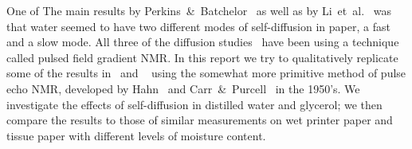 \documentclass[11pt,a4paper, twocolumn,
swedish, english %
]{article}
\begin{document}
One of The main results by
Perkins~\&~Batchelor~\cite{Perkins-Batchelor2012} as well as by
Li~et~al.~\cite{Li-etal1992} was that water 
seemed to have two different modes of self-diffusion in paper, a fast
and a slow mode. All three of the diffusion
studies~\cite{Perkins-Batchelor2012, Li-etal1992,
  Topgaard-Soderman2001} have been using a technique called pulsed 
field gradient NMR. In this report we try to qualitatively replicate
some of the results in~\cite{Perkins-Batchelor2012} and
~\cite{Li-etal1992} using the somewhat more primitive method of pulse
echo NMR, developed by Hahn~\cite{Hahn1950} and
Carr~\&~Purcell~\cite{Carr-Purcell1954} in the 1950's. We investigate
the effects of self-diffusion in distilled water and glycerol; we then
compare the results to those of similar measurements on wet printer
paper and tissue paper with different levels of moisture content.


\end{document}
